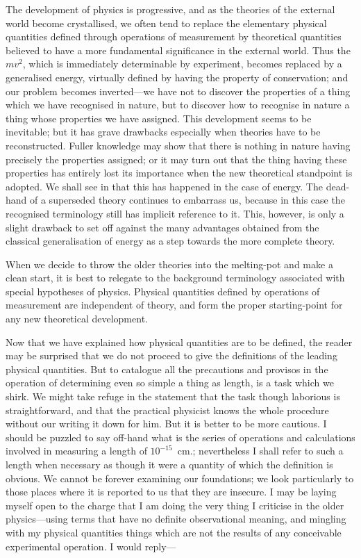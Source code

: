 \documentclass[12pt]{book}
\begin{document}
The development of physics is progressive, and as the theories of the
external world become crystallised, we often tend to replace the elementary
physical quantities defined through operations of measurement by theoretical
quantities believed to have a more fundamental significance in the external
world. Thus the  $mv^{2}$, which is immediately determinable by experiment,
becomes replaced by a generalised energy, virtually defined by having
the property of conservation; and our problem becomes inverted---we have
not to discover the properties of a thing which we have recognised in nature,
but to discover how to recognise in nature a thing whose properties we have
assigned. This development seems to be inevitable; but it has grave drawbacks
especially when theories have to be reconstructed. Fuller knowledge
may show that there is nothing in nature having precisely the properties
assigned; or it may turn out that the thing having these properties has
entirely lost its importance when the new theoretical standpoint is adopted\footnotemark.\footnotetext
  {We shall see in  that this has happened in the case of energy. The dead-hand of a
  superseded theory continues to embarrass us, because in this case the recognised terminology
  still has implicit reference to it. This, however, is only a slight drawback to set off against the
  many advantages obtained from the classical generalisation of energy as a step towards the more
  complete theory.}%

When we decide to throw the older theories into the melting-pot and make
a clean start, it is best to relegate to the background terminology associated
with special hypotheses of physics. Physical quantities defined by operations
of measurement are independent of theory, and form the proper starting-point
for any new theoretical development.

Now that we have explained how physical quantities are to be defined,
the reader may be surprised that we do not proceed to give the definitions of
the leading physical quantities. But to catalogue all the precautions and
provisos in the operation of determining even so simple a thing as length, is
a task which we shirk. We might take refuge in the statement that the task
though laborious is straightforward, and that the practical physicist knows
the whole procedure without our writing it down for him. But it is better to
be more cautious. I should be puzzled to say off-hand what is the series of
operations and calculations involved in measuring a length of $10^{-15}$~cm.;
nevertheless I shall refer to such a length when necessary as though it were
a quantity of which the definition is obvious. We cannot be forever examining
our foundations; we look particularly to those places where it is reported to
us that they are insecure. I may be laying myself open to the charge that
I am doing the very thing I criticise in the older physics---using terms that
have no definite observational meaning, and mingling with my physical
quantities things which are not the results of any conceivable experimental
operation. I would reply---
\end{document}
